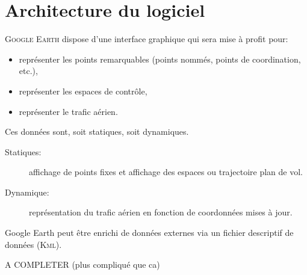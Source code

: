 


\section{Architecture du logiciel}

\textsc{Google Earth} dispose d’une interface graphique qui sera mise à profit pour:
\begin{itemize}
\item représenter les points remarquables (points nommés, points de coordination, etc.),
\item représenter les espaces de contrôle,
\item représenter le trafic aérien.
\end{itemize}\medskip

Ces données sont, soit statiques, soit dynamiques.
\begin{description}
\item[Statiques:] affichage de points fixes et affichage des espaces ou trajectoire plan de vol. 
\item[Dynamique:] représentation du trafic aérien en fonction de coordonnées mises à jour.
\end{description}

Google Earth peut être enrichi de données externes via un fichier descriptif de données (\textsc{Kml}).

A COMPLETER (plus compliqué que ca)



